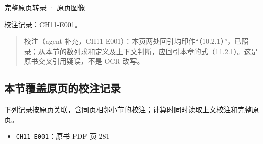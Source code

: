 \documentclass[
  10pt,
  fontset=fandol]{ctexart}
\providecommand{\tightlist}{%
  \setlength{\itemsep}{0pt}\setlength{\parskip}{0pt}}
\begin{document}
\href{../pages/pdf-281.md}{完整原页转录} · \href{../../source-images/pdf-281.jpeg}{原页图像}

校注记录：CH11-E001。

\begin{quote}
校注（agent 补充，CH11-E001）：本页两处回引均印作``（10.2.1）''，已照录；从本节的数列求和定义及上下文判断，应回引本章的式（11.2.1）。这是原书交叉引用疑误，不是 OCR 改写。
\end{quote}

\subsection{本节覆盖原页的校注记录}\label{ux672cux8282ux8986ux76d6ux539fux9875ux7684ux6821ux6ce8ux8bb0ux5f55}

下列记录按原页关联，含同页相邻小节的校注；计算时同时读取上文校注和完整原页。

\begin{itemize}
\tightlist
\item
  \texttt{CH11-E001}：原书 PDF 页 281
\end{itemize}
\end{document}
